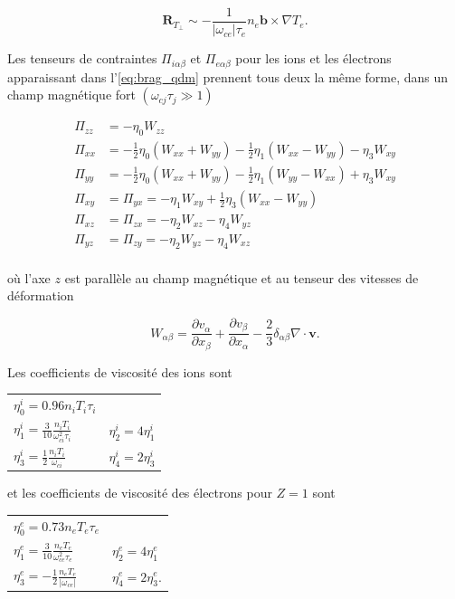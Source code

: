 \documentclass[main.tex]{subfiles}
\begin{document}
\[
	\bm{R}_{T_\perp} \sim - \frac{1}{\left\vert \omega_{ce}\right\vert \tau_e} n_e \bm{b} \times \nabla T_e.
\]

\nit Les tenseurs de contraintes \( \Pi_{i\alpha\beta} \) et \( \Pi_{e\alpha\beta} \) pour les ions et les électrons apparaissant dans l'\autoref{eq:brag_qdm} prennent tous deux la même forme, dans un champ magnétique fort \( \left( \omega_{cj} \tau_j \gg 1\right) \)

\begin{align*}
	\Pi_{zz} &= - \eta_0 W_{zz}\\
	\Pi_{xx} &= - \frac{1}{2} \eta_0 \left( W_{xx} + W_{yy}\right) - \frac{1}{2} \eta_1 \left( W_{xx} - W_{yy}\right) - \eta_3 W_{xy}\\
	\Pi_{yy} &=- \frac{1}{2} \eta_0 \left( W_{xx} + W_{yy}\right) - \frac{1}{2} \eta_1 \left( W_{yy} - W_{xx}\right) + \eta_3 W_{xy}\\
	\Pi_{xy} &= \Pi_{yx} = - \eta_1W_{xy} + \frac{1}{2} \eta_3 \left( W_{xx} - W_{yy} \right)\\
	\Pi_{xz} &= \Pi_{zx} = -\eta_2 W_{xz} - \eta_4 W_{yz}\\
	\Pi_{yz} &= \Pi_{zy} = -\eta_2 W_{yz} - \eta_4 W_{xz}\\
\end{align*}

\nit où l'axe \( z \) est parallèle au champ magnétique et au tenseur des vitesses de déformation

\[
	W_{\alpha \beta} = \frac{\partial v_\alpha}{\partial x_\beta} + \frac{\partial v_\beta}{\partial x_\alpha} - \frac{2}{3} \delta_{\alpha \beta} \nabla \cdot \bm{v}.
\]

\nit Les coefficients de viscosité des ions sont

\begin{tabular}{l l}
	\( \eta_0^i = 0.96 n_i T_i \tau_i \) & \\
	\rule[-1.5ex]{0pt}{4ex}
	\( \eta_1^i = \frac{3}{10} \frac{n_i T_i}{\omega_{ci}^2 \tau_i} \) & \( \eta_2^i = 4\eta_1^i \)\\
	\rule[-1.5ex]{0pt}{4ex}
	\( \eta_3^i = \frac{1}{2} \frac{n_i T_i}{\omega_{ci}} \) & \( \eta_4^i = 2 \eta_3^i \)
\end{tabular}

\nit et les coefficients de viscosité des électrons pour \( Z=1 \) sont

\begin{tabular}{l l}
	\( \eta_0^e = 0.73 n_e T_e \tau_e \) & \\
	\rule[-1.5ex]{0pt}{4ex}
	\( \eta_1^e = \frac{3}{10} \frac{n_e T_e}{\omega_{ce}^2 \tau_e} \) & \( \eta_2^e = 4\eta_1^e \)\\
	\rule[-1.5ex]{0pt}{4ex}
	\( \eta_3^e = -\frac{1}{2} \frac{n_e T_e}{\left\vert\omega_{ce}\right\vert} \) & \( \eta_4^e = 2 \eta_3^e \).
\end{tabular}
\end{document}
